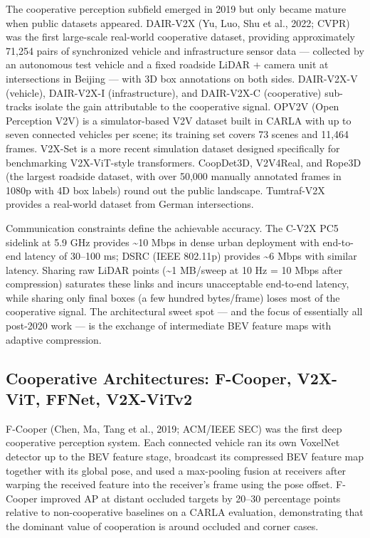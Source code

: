 \documentclass{article}
\begin{document}
The cooperative perception subfield emerged in 2019 but only became mature when public datasets appeared. DAIR-V2X (Yu, Luo, Shu et al., 2022; CVPR) was the first large-scale real-world cooperative dataset, providing approximately 71,254 pairs of synchronized vehicle and infrastructure sensor data --- collected by an autonomous test vehicle and a fixed roadside LiDAR + camera unit at intersections in Beijing --- with 3D box annotations on both sides. DAIR-V2X-V (vehicle), DAIR-V2X-I (infrastructure), and DAIR-V2X-C (cooperative) sub-tracks isolate the gain attributable to the cooperative signal. OPV2V (Open Perception V2V) is a simulator-based V2V dataset built in CARLA with up to seven connected vehicles per scene; its training set covers 73 scenes and 11,464 frames. V2X-Set is a more recent simulation dataset designed specifically for benchmarking V2X-ViT-style transformers. CoopDet3D, V2V4Real, and Rope3D (the largest roadside dataset, with over 50,000 manually annotated frames in 1080p with 4D box labels) round out the public landscape. Tumtraf-V2X provides a real-world dataset from German intersections.

Communication constraints define the achievable accuracy. The C-V2X PC5 sidelink at 5.9 GHz provides \textasciitilde10 Mbps in dense urban deployment with end-to-end latency of 30--100 ms; DSRC (IEEE 802.11p) provides \textasciitilde6 Mbps with similar latency. Sharing raw LiDAR points (\textasciitilde1 MB/sweep at 10 Hz = 10 Mbps after compression) saturates these links and incurs unacceptable end-to-end latency, while sharing only final boxes (a few hundred bytes/frame) loses most of the cooperative signal. The architectural sweet spot --- and the focus of essentially all post-2020 work --- is the exchange of intermediate BEV feature maps with adaptive compression.

\subsection{Cooperative Architectures: F-Cooper, V2X-ViT, FFNet, V2X-ViTv2}\label{cooperative-architectures-f-cooper-v2x-vit-ffnet-v2x-vitv2}

F-Cooper (Chen, Ma, Tang et al., 2019; ACM/IEEE SEC) was the first deep cooperative perception system. Each connected vehicle ran its own VoxelNet detector up to the BEV feature stage, broadcast its compressed BEV feature map together with its global pose, and used a max-pooling fusion at receivers after warping the received feature into the receiver's frame using the pose offset. F-Cooper improved AP at distant occluded targets by 20--30 percentage points relative to non-cooperative baselines on a CARLA evaluation, demonstrating that the dominant value of cooperation is around occluded and corner cases.
\end{document}
